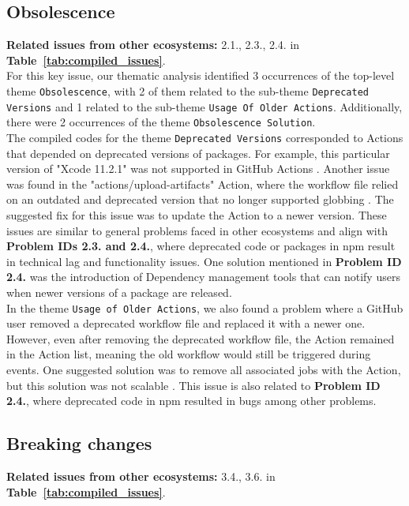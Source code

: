 \documentclass[conference]{IEEEtran}
\begin{document}
\subsection*{\textbf{Obsolescence}}
\textbf{Related issues from other ecosystems:} 2.1., 2.3., 2.4. in \textbf{Table~\ref{tab:compiled_issues}}.\\

	For this key issue, our thematic analysis identified 3 occurrences of the top-level theme \texttt{Obsolescence}, with 2 of them related to the sub-theme \texttt{Deprecated Versions} and 1 related to the sub-theme \texttt{Usage Of Older Actions}. Additionally, there were 2 occurrences of the theme \texttt{Obsolescence Solution}.\\
The compiled codes for the theme \texttt{Deprecated Versions} corresponded to Actions that depended on deprecated versions of packages. For example, this particular version of "Xcode 11.2.1" was not supported in GitHub Actions \cite{sinoru2024}. Another issue was found in the "actions/upload-artifacts" Action, where the workflow file relied on an outdated and deprecated version that no longer supported globbing \cite{graysuit2024}. The suggested fix for this issue was to update the Action to a newer version. These issues are similar to general problems faced in other ecosystems and align with \textbf{Problem IDs 2.3. and 2.4.}, where deprecated code or packages in npm result in technical lag and functionality issues. One solution mentioned in \textbf{Problem ID 2.4.} was the introduction of Dependency management tools that can notify users when newer versions of a package are released.\\
In the theme \texttt{Usage of Older Actions}, we also found a problem where a GitHub user removed a deprecated workflow file and replaced it with a newer one. However, even after removing the deprecated workflow file, the Action remained in the Action list, meaning the old workflow would still be triggered during events. One suggested solution was to remove all associated jobs with the Action, but this solution was not scalable \cite{ryanvanderpol2024}. This issue is also related to \textbf{Problem ID 2.4.}, where deprecated code in npm resulted in bugs among other problems. 
\subsection*{\textbf{Breaking changes}}
\textbf{Related issues from other ecosystems:} 3.4., 3.6. in \textbf{Table~\ref{tab:compiled_issues}}.\\
\end{document}
